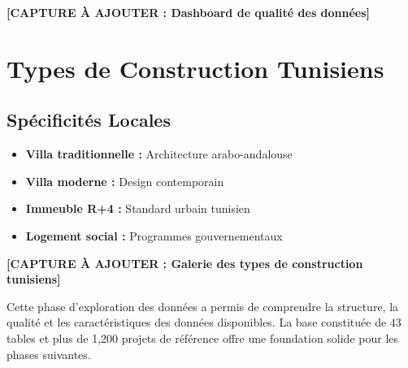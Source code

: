 \textbf{[CAPTURE À AJOUTER : Dashboard de qualité des données]}

\section{Types de Construction Tunisiens}

\subsection{Spécificités Locales}

\begin{itemize}
    \item \textbf{Villa traditionnelle :} Architecture arabo-andalouse
    \item \textbf{Villa moderne :} Design contemporain
    \item \textbf{Immeuble R+4 :} Standard urbain tunisien
    \item \textbf{Logement social :} Programmes gouvernementaux
\end{itemize}

\textbf{[CAPTURE À AJOUTER : Galerie des types de construction tunisiens]}

\begin{resultbox}
Cette phase d'exploration des données a permis de comprendre la structure, la qualité et les caractéristiques des données disponibles. La base constituée de 43 tables et plus de 1,200 projets de référence offre une foundation solide pour les phases suivantes.
\end{resultbox}
